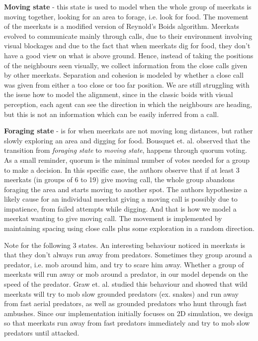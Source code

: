 \documentclass[9pt,twoside]{pnas-new}
\begin{document}
\textbf{Moving state} - this state is used to model when the whole group of meerkats is moving together, looking for an area to forage, i.e. look for food. 
The movement of the meerkats is a modified version of Reynold's Boids algorithm. 
Meerkats evolved to communicate mainly through calls, due to their environment involving visual blockages and due to the fact that when meerkats dig for food,
they don't have a good view on what is above ground. 
Hence, instead of taking the positions of the neighbours seen visually, we collect information from the close calls given by other meerkats. 
Separation and cohesion is modeled by whether a close call was given from either a too close or too far position. We are still struggling with the issue how to model the alignment, since in the classic boids with visual perception, each agent can see the direction in which the neighbours are heading, but this is not an information which can be easily inferred from a call.

\textbf{Foraging state} - is for when meerkats are not moving long distances, but rather slowly exploring an area and digging for food. 
Bousquet et. al. \cite{bousquet2011moving} observed that the transition from \emph{foraging state} to \emph{moving state}, happens through quorum voting. 
As a small reminder, quorum is the minimal number of votes needed for a group to make a decision. In this specific case, the authors observe that if at least 3 meerkats (in groups of 6 to 19) give moving call, the whole group abandons foraging the area and starts moving to another spot.
The authors hypothesize a likely cause for an individual meerkat giving a moving call is possibly due to impatience, from failed attempts while digging. And that is how we model a meerkat wanting to give moving call. The movement is implemented by maintaining spacing using close calls plus some exploration in a random direction. 

Note for the following 3 states. An interesting behaviour noticed in meerkats is that they don't always run away from predators. 
Sometimes they group around a predator, i.e. mob around him, and try to scare him away. Whether a group of meerkats will run away or mob around a predator, in our model depends on the speed of the predator. 
Graw et. al. \cite{graw2007role} studied this behaviour and showed that wild meerkats will try to mob slow grounded predators (ex. snakes) and run away from fast aerial predators, as well as grounded predators who hunt through fast ambushes. 
Since our implementation initially focuses on 2D simulation, we design so that meerkats run away from fast predators immediately and try to mob slow predators until attacked.
\end{document}
